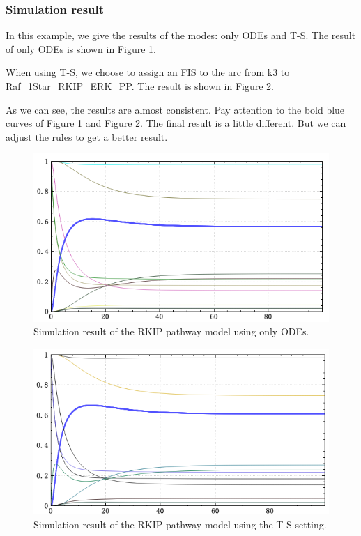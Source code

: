 \documentclass[journal,a4paper,onecolumn]{article}
\begin{document}
\subsubsection{Simulation result}
In this example, we give the results of the modes: only ODEs and T-S. The result of only ODEs is shown in Figure \ref{fig:Simulation result of RKIP using only ODEs.}.

When using T-S, we choose to assign an FIS to the arc from k3 to Raf\_1Star\_RKIP\_ERK\_PP. The result is shown in Figure \ref{fig:Simulation result of RKIP using T-S.}.

As we can see, the results are almost consistent. Pay attention to the bold blue curves of Figure \ref{fig:Simulation result of RKIP using only ODEs.} and Figure \ref{fig:Simulation result of RKIP using T-S.}. The final result is a little different. But we can adjust the rules to get a better result.

\begin{figure}[!hbt]
	\begin{center}
		\includegraphics[width=\columnwidth]{fig29}
		\caption{Simulation result of the RKIP pathway model using only ODEs.}
		\label{fig:Simulation result of RKIP using only ODEs.}
	\end{center}
\end{figure}

\begin{figure}[!hbt]
	\begin{center}
		\includegraphics[width=\columnwidth]{fig30}
		\caption{Simulation result of the RKIP pathway model using the T-S setting.}
		\label{fig:Simulation result of RKIP using T-S.}
	\end{center}
\end{figure}
\end{document}
